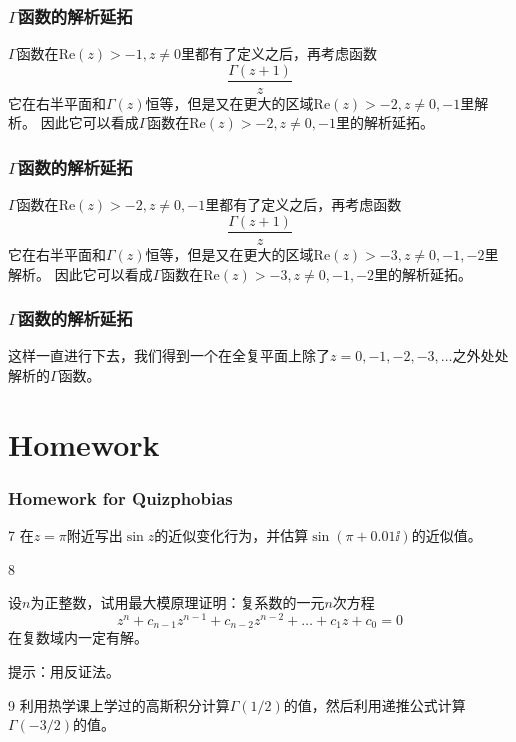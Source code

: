 \documentclass[CJK, 13pt]{beamer}
\begin{document}
\begin{frame}
  \frametitle{$\Gamma$函数的解析延拓}
  
  $\Gamma$函数在$\mathrm{Re}(z)>-1, z\ne 0$里都有了定义之后，再考虑函数
  $$ \frac{\Gamma(z+1)}{z} $$
  它在右半平面和$\Gamma(z)$恒等，但是又在更大的区域$\mathrm{Re}(z)>-2, z\ne 0, -1$里解析。
  因此它可以看成$\Gamma$函数在$\mathrm{Re}(z)>-2, z\ne 0, -1$里的解析延拓。
  
\end{frame}


\begin{frame}
  \frametitle{$\Gamma$函数的解析延拓}
  
  $\Gamma$函数在$\mathrm{Re}(z)>-2, z\ne 0,-1$里都有了定义之后，再考虑函数
  $$ \frac{\Gamma(z+1)}{z} $$
  它在右半平面和$\Gamma(z)$恒等，但是又在更大的区域$\mathrm{Re}(z)>-3, z\ne 0, -1,-2$里解析。
  因此它可以看成$\Gamma$函数在$\mathrm{Re}(z)>-3, z\ne 0, -1,-2$里的解析延拓。
  
\end{frame}


\begin{frame}
  \frametitle{$\Gamma$函数的解析延拓}
  
  这样一直进行下去，我们得到一个在全复平面上除了$z=0,-1,-2,-3,\ldots$之外处处解析的$\Gamma$函数。

  
\end{frame}

\section{Homework}

\begin{frame}
  \frametitle{Homework for Quizphobias}
  
  \bitem
\item[7]{在$z=\pi$附近写出$\sin z$的近似变化行为，并估算$\sin(\pi + 0.01\ii)$的近似值。}
\item[8]{设$n$为正整数，试用最大模原理证明：复系数的一元$n$次方程
  $$z^n+c_{n-1}z^{n-1}+c_{n-2}z^{n-2}+\ldots + c_1z + c_0 = 0$$
  在复数域内一定有解。

  提示：用反证法。}
\item[9]{利用热学课上学过的高斯积分计算$\Gamma(1/2)$的值，然后利用递推公式计算$\Gamma(-3/2)$的值。}

  \eitem
  
\end{frame}

\ech
\end{document}
